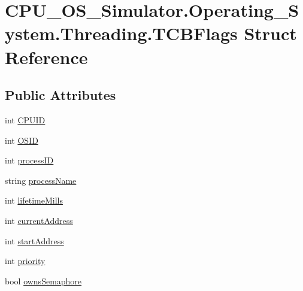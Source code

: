 \hypertarget{struct_c_p_u___o_s___simulator_1_1_operating___system_1_1_threading_1_1_t_c_b_flags}{}\section{C\+P\+U\+\_\+\+O\+S\+\_\+\+Simulator.\+Operating\+\_\+\+System.\+Threading.\+T\+C\+B\+Flags Struct Reference}
\label{struct_c_p_u___o_s___simulator_1_1_operating___system_1_1_threading_1_1_t_c_b_flags}
\subsection*{Public Attributes}
\begin{DoxyCompactItemize}
\item 
int \hyperlink{struct_c_p_u___o_s___simulator_1_1_operating___system_1_1_threading_1_1_t_c_b_flags_a4230e0b12707667e7b7a88d5e698abe7}{C\+P\+U\+I\+D}
\item 
int \hyperlink{struct_c_p_u___o_s___simulator_1_1_operating___system_1_1_threading_1_1_t_c_b_flags_a3682d815bd1732f8a68bc74f904daf77}{O\+S\+I\+D}
\item 
int \hyperlink{struct_c_p_u___o_s___simulator_1_1_operating___system_1_1_threading_1_1_t_c_b_flags_a7d798ff11e248251c133bfecfcfbaa71}{process\+I\+D}
\item 
string \hyperlink{struct_c_p_u___o_s___simulator_1_1_operating___system_1_1_threading_1_1_t_c_b_flags_abba69ca48016bca660241bb8d84630d6}{process\+Name}
\item 
int \hyperlink{struct_c_p_u___o_s___simulator_1_1_operating___system_1_1_threading_1_1_t_c_b_flags_a5a56cd636744421cccd0bb32c686babc}{lifetime\+Mills}
\item 
int \hyperlink{struct_c_p_u___o_s___simulator_1_1_operating___system_1_1_threading_1_1_t_c_b_flags_ac2749b16ff2c2b74e44947f470c53cf7}{current\+Address}
\item 
int \hyperlink{struct_c_p_u___o_s___simulator_1_1_operating___system_1_1_threading_1_1_t_c_b_flags_a84ebb1b8e203aeb18912b0aee1b40f2e}{start\+Address}
\item 
int \hyperlink{struct_c_p_u___o_s___simulator_1_1_operating___system_1_1_threading_1_1_t_c_b_flags_a91425abbcfcb467ac592b081f618d0bd}{priority}
\item 
bool \hyperlink{struct_c_p_u___o_s___simulator_1_1_operating___system_1_1_threading_1_1_t_c_b_flags_adfce01db8bdf40ae9de92db00095737a}{owns\+Semaphore}

\end{DoxyCompactItemize}
